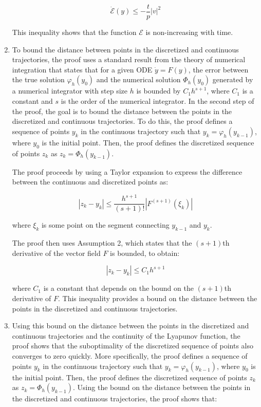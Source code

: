 \begin{enumerate}
$$
\dot{\mathcal{E}}(y) \le -\frac{t}{p} |v|^2
$$

    This inequality shows that the function $\mathcal{E}$ is non-increasing with time.

    \item To bound the distance between points in the discretized and continuous trajectories, the proof uses a standard result from the theory of numerical integration that states that for a given ODE $\dot{y}=F(y)$, the error between the true solution $\varphi_h(y_0)$ and the numerical solution $\Phi_h(y_0)$ generated by a numerical integrator with step size $h$ is bounded by $C_1 h^{s+1}$, where $C_1$ is a constant and $s$ is the order of the numerical integrator.
    In the second step of the proof, the goal is to bound the distance between the points in the discretized and continuous trajectories. To do this, the proof defines a sequence of points $y_k$ in the continuous trajectory such that $y_k = \varphi_h(y_{k-1})$, where $y_0$ is the initial point. Then, the proof defines the discretized sequence of points $z_k$ as $z_k = \Phi_h(y_{k-1})$.

    The proof proceeds by using a Taylor expansion to express the difference between the continuous and discretized points as:

    $$
    |z_k - y_k| \le \frac{h^{s+1}}{(s+1)!} |F^{(s+1)}(\xi_k)|
    $$

    where $\xi_k$ is some point on the segment connecting $y_{k-1}$ and $y_k$.

    The proof then uses Assumption 2, which states that the $(s+1)$th derivative of the vector field $F$ is bounded, to obtain:

    $$
    |z_k - y_k| \le C_1 h^{s+1}
    $$

    where $C_1$ is a constant that depends on the bound on the $(s+1)$th derivative of $F$. This inequality provides a bound on the distance between the points in the discretized and continuous trajectories.

    \item Using this bound on the distance between the points in the discretized and continuous trajectories and the continuity of the Lyapunov function, the proof shows that the suboptimality of the discretized sequence of points also converges to zero quickly.
    More specifically, the proof defines a sequence of points $y_k$ in the continuous trajectory such that $y_k = \varphi_h(y_{k-1})$, where $y_0$ is the initial point. Then, the proof defines the discretized sequence of points $z_k$ as $z_k = \Phi_h(y_{k-1})$. Using the bound on the distance between the points in the discretized and continuous trajectories, the proof shows that:


\end{enumerate}
